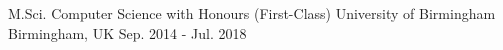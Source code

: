 

\begin{cventries}

  \cventry
  {M.Sci. Computer Science with Honours (First-Class)} %
    {University of Birmingham} %
    {Birmingham, UK} %
    {Sep. 2014 - Jul. 2018} %
    {}


\end{cventries}
